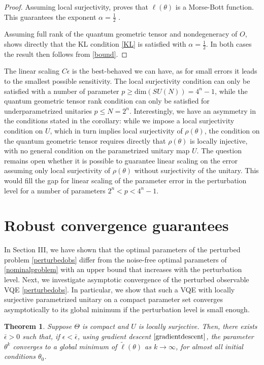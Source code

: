 \documentclass[letterpaper, 10 pt]{IEEEtran}  %
\newtheorem{theorem}{Theorem}
\begin{document}
\begin{proof}
   Assuming local surjectivity, \cite[Appendix C]{Wiedmann2025} proves that $\ell (\theta)$ is a Morse-Bott function. This guarantees the exponent $\alpha=\frac{1}{2}$ \cite{Feehan2020}. 

Assuming full rank of the quantum geometric tensor and nondegeneracy of $O$, \cite{Zunkovic2026} shows directly that the KL condition \eqref{KL} is satisfied with $\alpha=\frac{1}{2}$.
In both cases the result then follows from \eqref{bound}.  

\end{proof}
The linear scaling $C \epsilon$ is the best-behaved we can have, as for small errors it leads to the smallest possible sensitivity.
The local surjectivity condition can only be satisfied with a number of parameter $p\ge\text{dim}(SU(N))=4^n-1$, while the quantum geometric tensor rank condition can only be satisfied for underparametrized unitaries $p \le N=2^n$. 
Interestingly, we have an asymmetry in the conditions stated in the corollary: 
while we impose a local surjectivity condition on $U$, which in turn implies local surjectivity of $\rho(\theta)$, 
the condition on the quantum geometric tensor requires directly that $\rho(\theta)$ is locally injective, with no general condition on the parametrized unitary map $U$. 
The question remains open whether it is possible to guarantee linear scaling on the error assuming only local surjectivity of $\rho(\theta)$ without surjectivity of the unitary.   
This would fill the gap for linear scaling of the parameter error in the perturbation level for a number of parameters $2^n < p <4^n-1$. 
\\


\section{Robust convergence guarantees}
In Section III, we have shown that the optimal parameters of the perturbed problem \eqref{perturbedobs} differ from the noise-free optimal parameters of \eqref{nominalproblem} with an upper bound that increases with the perturbation level.
Next, we investigate asymptotic convergence of the perturbed observable VQE \eqref{perturbedobs}.
In particular, we show that such a VQE with locally surjective parametrized unitary on a compact parameter set converges asymptotically to its global minimum if the perturbation level is small enough.
 
\begin{theorem}
   Suppose $\Theta$ is compact and $U$ is locally surjective.
   Then, there exists $\bar \epsilon>0$ such that, if $\epsilon < \bar \epsilon$, using gradient descent $\eqref{gradientdescent}$, the parameter $\theta^k$ converges to a global minimum of $\tilde\ell(\theta)$ as $k\rightarrow\infty$, for almost all initial conditions $\theta_0$. 
\end{theorem}
\end{document}
